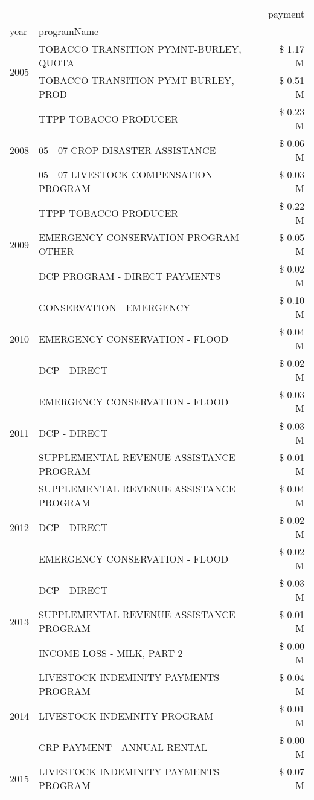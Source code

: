 \begin{tabular}{llr}
\toprule
 &  & payment \\
year & programName &  \\
\midrule
\multirow[t]{2}{*}{2005} & TOBACCO TRANSITION PYMNT-BURLEY, QUOTA & \$ 1.17 M \\
 & TOBACCO TRANSITION PYMT-BURLEY, PROD & \$ 0.51 M \\
\cline{1-3}
\multirow[t]{3}{*}{2008} & TTPP TOBACCO PRODUCER & \$ 0.23 M \\
 & 05 - 07 CROP DISASTER ASSISTANCE & \$ 0.06 M \\
 & 05 - 07 LIVESTOCK COMPENSATION PROGRAM & \$ 0.03 M \\
\cline{1-3}
\multirow[t]{3}{*}{2009} & TTPP TOBACCO PRODUCER & \$ 0.22 M \\
 & EMERGENCY CONSERVATION PROGRAM - OTHER & \$ 0.05 M \\
 & DCP PROGRAM - DIRECT PAYMENTS & \$ 0.02 M \\
\cline{1-3}
\multirow[t]{3}{*}{2010} & CONSERVATION - EMERGENCY & \$ 0.10 M \\
 & EMERGENCY CONSERVATION - FLOOD & \$ 0.04 M \\
 & DCP - DIRECT & \$ 0.02 M \\
\cline{1-3}
\multirow[t]{3}{*}{2011} & EMERGENCY CONSERVATION - FLOOD & \$ 0.03 M \\
 & DCP - DIRECT & \$ 0.03 M \\
 & SUPPLEMENTAL REVENUE ASSISTANCE PROGRAM & \$ 0.01 M \\
\cline{1-3}
\multirow[t]{3}{*}{2012} & SUPPLEMENTAL REVENUE ASSISTANCE PROGRAM & \$ 0.04 M \\
 & DCP - DIRECT & \$ 0.02 M \\
 & EMERGENCY CONSERVATION - FLOOD & \$ 0.02 M \\
\cline{1-3}
\multirow[t]{3}{*}{2013} & DCP - DIRECT & \$ 0.03 M \\
 & SUPPLEMENTAL REVENUE ASSISTANCE PROGRAM & \$ 0.01 M \\
 & INCOME LOSS - MILK, PART 2 & \$ 0.00 M \\
\cline{1-3}
\multirow[t]{3}{*}{2014} & LIVESTOCK INDEMINITY PAYMENTS PROGRAM & \$ 0.04 M \\
 & LIVESTOCK INDEMNITY PROGRAM & \$ 0.01 M \\
 & CRP PAYMENT - ANNUAL RENTAL & \$ 0.00 M \\
\cline{1-3}
\multirow[t]{3}{*}{2015} & LIVESTOCK INDEMINITY PAYMENTS PROGRAM & \$ 0.07 M \\

\end{tabular}
